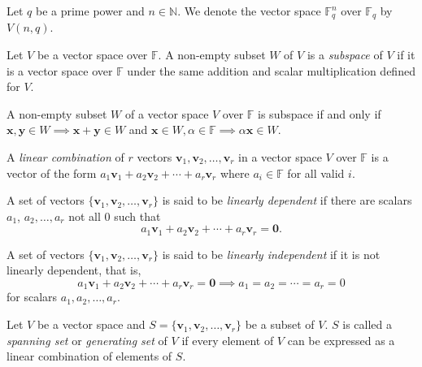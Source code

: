 \vspace{2mm}
Let $q$ be a prime power and $n\in\mathbb{N}$. We denote the vector space $\mathbb{F}_q^n$ over $\mathbb{F}_q$ by $V(n,q)$.


\begin{definition}
    Let $V$ be a vector space over $\mathbb{F}$. A non-empty subset $W$ of $V$ is a \textit{subspace} of $V$ if it is a vector space over $\mathbb{F}$ under the same addition and scalar multiplication defined for $V$. 
\end{definition}

\begin{theorem}
    A non-empty subset $W$ of a vector space $V$ over $\mathbb{F}$ is subspace if and only if $\textbf{x},\textbf{y}\in W\implies \textbf{x}+\textbf{y}\in W$ and $\textbf{x}\in W, \alpha\in\mathbb{F}\implies \alpha \textbf{x}\in W$.
\end{theorem}

\begin{definition}
    A \textit{linear combination} of $r$ vectors $\textbf{v}_1,\textbf{v}_2,\ldots,\textbf{v}_r$ in a vector space $V$ over $\mathbb{F}$ is a vector of the form $a_1\textbf{v}_1+a_2\textbf{v}_2+\cdots+a_r\textbf{v}_r$ where $a_i\in\mathbb{F}$ for all valid $i$.
\end{definition}

\begin{definition}
    A set of vectors $\{\textbf{v}_1,\textbf{v}_2,\ldots,\textbf{v}_r\}$ is said to be \textit{linearly dependent} if there are scalars $a_1$, $a_2,\ldots,a_r$ not all $0$ such that
    $$a_1\textbf{v}_1+a_2\textbf{v}_2+\cdots+a_r\textbf{v}_r=\textbf{0}.$$
\end{definition}

\begin{definition}
    A set of vectors $\{\textbf{v}_1,\textbf{v}_2,\ldots,\textbf{v}_r\}$ is said to be \textit{linearly independent} if it is not linearly dependent, that is,
    $$a_1\textbf{v}_1+a_2\textbf{v}_2+\cdots+a_r\textbf{v}_r=\textbf{0}\implies a_1=a_2=\cdots=a_r=0$$
    for scalars $a_1,a_2,\ldots,a_r$.
\end{definition}

\begin{definition}
    Let $V$ be a vector space and $S=\{\textbf{v}_1,\textbf{v}_2,\ldots,\textbf{v}_r\}$ be a subset of $V$. $S$ is called a \textit{spanning set} or \textit{generating set} of $V$ if every element of $V$ can be expressed as a linear combination of elements of $S$.
\end{definition}

